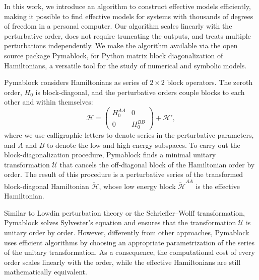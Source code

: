 In this work, we introduce an algorithm to construct effective models
efficiently, making it possible to find effective models for systems with
thousands of degrees of freedom in a personal computer.
Our algorithm scales linearly with the perturbative order, does not require
truncating the outputs, and treats multiple perturbations independently.
We make the algorithm available via the open source package Pymablock, for
Python matrix block diagonalization of Hamiltonians, a versatile tool for
the study of numerical and symbolic models.

Pymablock considers Hamiltonians as series of $2\times 2$ block operators.
The zeroth order, $H_0$ is block-diagonal, and the perturbative orders couple
blocks to each other and within themselves:
%
\begin{equation}
\mathcal{H} = \begin{pmatrix}H_0^{AA} & 0 \\ 0 & H_0^{BB}\end{pmatrix} + \mathcal{H}',
\end{equation}
%
where we use calligraphic letters to denote series in the perturbative
parameters, and $A$ and $B$ to denote the low and high energy subspaces.
To carry out the block-diagonalization procedure, Pymablock finds a minimal
unitary transformation $\mathcal{U}$ that cancels the off-diagonal block of the
Hamiltonian order by order.
The result of this procedure is a perturbative series of the transformed
block-diagonal Hamiltonian $\tilde{\mathcal{H}}$, whose low energy block
$\tilde{\mathcal{H}}^{AA}$ is the effective Hamiltonian.

Similar to Lowdin perturbation theory or the Schrieffer--Wolff transformation,
Pymablock solves Sylvester's equation and ensures that the transformation
$\mathcal{U}$ is unitary order by order.
However, differently from other approaches, Pymablock uses efficient algorithms
by choosing an appropriate parametrization of the series of the unitary
transformation.
As a consequence, the computational cost of every order scales linearly with
the order, while the effective Hamiltonians are still mathematically equivalent.
